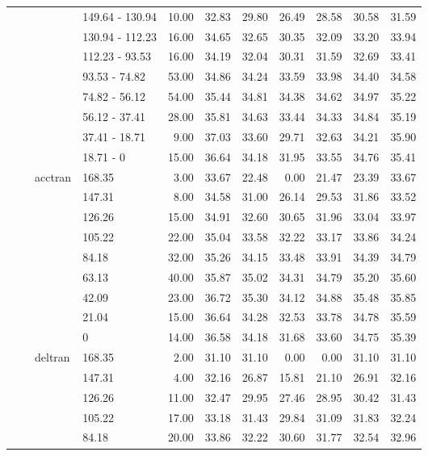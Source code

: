 \begin{longtable}{llllrrrrrrr}
   &  &  & 149.64 - 130.94 & 10.00 & 32.83 & 29.80 & 26.49 & 28.58 & 30.58 & 31.59 \\ 
   &  &  & 130.94 - 112.23 & 16.00 & 34.65 & 32.65 & 30.35 & 32.09 & 33.20 & 33.94 \\ 
   &  &  & 112.23 - 93.53 & 16.00 & 34.19 & 32.04 & 30.31 & 31.59 & 32.69 & 33.41 \\ 
   &  &  & 93.53 - 74.82 & 53.00 & 34.86 & 34.24 & 33.59 & 33.98 & 34.40 & 34.58 \\ 
   &  &  & 74.82 - 56.12 & 54.00 & 35.44 & 34.81 & 34.38 & 34.62 & 34.97 & 35.22 \\ 
   &  &  & 56.12 - 37.41 & 28.00 & 35.81 & 34.63 & 33.44 & 34.33 & 34.84 & 35.19 \\ 
   &  &  & 37.41 - 18.71 & 9.00 & 37.03 & 33.60 & 29.71 & 32.63 & 34.21 & 35.90 \\ 
   &  &  & 18.71 - 0 & 15.00 & 36.64 & 34.18 & 31.95 & 33.55 & 34.76 & 35.41 \\ 
   &  & acctran & 168.35 & 3.00 & 33.67 & 22.48 & 0.00 & 21.47 & 23.39 & 33.67 \\ 
   &  &  & 147.31 & 8.00 & 34.58 & 31.00 & 26.14 & 29.53 & 31.86 & 33.52 \\ 
   &  &  & 126.26 & 15.00 & 34.91 & 32.60 & 30.65 & 31.96 & 33.04 & 33.97 \\ 
   &  &  & 105.22 & 22.00 & 35.04 & 33.58 & 32.22 & 33.17 & 33.86 & 34.24 \\ 
   &  &  & 84.18 & 32.00 & 35.26 & 34.15 & 33.48 & 33.91 & 34.39 & 34.79 \\ 
   &  &  & 63.13 & 40.00 & 35.87 & 35.02 & 34.31 & 34.79 & 35.20 & 35.60 \\ 
   &  &  & 42.09 & 23.00 & 36.72 & 35.30 & 34.12 & 34.88 & 35.48 & 35.85 \\ 
   &  &  & 21.04 & 15.00 & 36.64 & 34.28 & 32.53 & 33.78 & 34.78 & 35.59 \\ 
   &  &  & 0 & 14.00 & 36.58 & 34.18 & 31.68 & 33.60 & 34.75 & 35.39 \\ 
   &  & deltran & 168.35 & 2.00 & 31.10 & 31.10 & 0.00 & 0.00 & 31.10 & 31.10 \\ 
   &  &  & 147.31 & 4.00 & 32.16 & 26.87 & 15.81 & 21.10 & 26.91 & 32.16 \\ 
   &  &  & 126.26 & 11.00 & 32.47 & 29.95 & 27.46 & 28.95 & 30.42 & 31.43 \\ 
   &  &  & 105.22 & 17.00 & 33.18 & 31.43 & 29.84 & 31.09 & 31.83 & 32.24 \\ 
   &  &  & 84.18 & 20.00 & 33.86 & 32.22 & 30.60 & 31.77 & 32.54 & 32.96 \\ 

\end{longtable}
